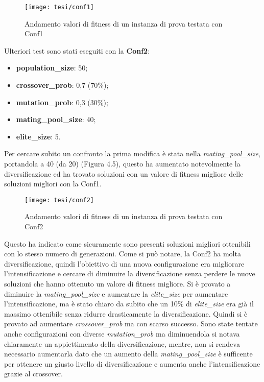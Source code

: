 \begin{figure}[!ht] 
    \centering 
    \texttt{[image: tesi/conf1]} 
    \caption{Andamento valori di fitness di un instanza di prova testata con Conf1}
\end{figure}

Ulteriori test sono stati eseguiti con la \textbf{Conf2}:
\begin{itemize}
	\item\textbf{population\_size}: 50;
	\item\textbf{crossover\_prob}: 0,7 (70\%);
	\item\textbf{mutation\_prob}: 0,3 (30\%);
	\item\textbf{mating\_pool\_size}: 40;
	\item\textbf{elite\_size}: 5.
\end{itemize}

Per cercare subito un confronto la prima modifica è stata nella \emph{mating\_pool\_size}, portandola a 40 (da 20) (Figura 4.5), questo ha aumentato notevolmente la diversificazione ed ha trovato soluzioni con un valore di fitness migliore delle soluzioni migliori con la Conf1. 

\begin{figure}[!ht] 
    \centering 
    \texttt{[image: tesi/conf2]} 
    \caption{Andamento valori di fitness di un instanza di prova testata con Conf2}
\end{figure}

Questo ha indicato come sicuramente sono presenti soluzioni migliori ottenibili con lo stesso numero di generazioni. Come si può notare, la Conf2 ha molta diversificazione, quindi l'obiettivo di una nuova configurazione era migliorare l'intensificazione e cercare di diminuire la diversificazione senza perdere le nuove soluzioni che hanno ottenuto un valore di fitness migliore. Si è provato a diminuire la \emph{mating\_pool\_size} e aumentare la \emph{elite\_size} per aumentare l'intensificazione, ma è stato chiaro da subito che un 10\% di \emph{elite\_size} era già il massimo ottenibile senza ridurre drasticamente la diversificazione. Quindi si è provato ad aumentare \emph{crossover\_prob} ma con scarso successo. Sono state tentate anche configurazioni con diverse \emph{mutation\_prob} ma diminuendola si notava chiaramente un appiettimento della diversificazione, mentre, non si rendeva necessario aumentarla dato che un aumento della \emph{mating\_pool\_size} è sufficente per ottenere un giusto livello di diversificazione e aumenta anche l'intensificazione grazie al crossover.

